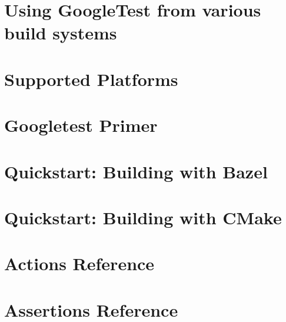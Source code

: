\let\mypdfximage\pdfximage\def\pdfximage{\immediate\mypdfximage}\documentclass[twoside]{book}
\newcommand{\+}{\discretionary{\mbox{\scriptsize$\hookleftarrow$}}{}{}}
\begin{document}
\chapter{Using Google\+Test from various build systems}
\label{md_04_cmake_build_debug__deps_googletest_src_docs_pkgconfig}

\chapter{Supported Platforms}
\label{md_04_cmake_build_debug__deps_googletest_src_docs_platforms}

\chapter{Googletest Primer}
\label{md_04_cmake_build_debug__deps_googletest_src_docs_primer}

\chapter{Quickstart\+: Building with Bazel}
\label{md_04_cmake_build_debug__deps_googletest_src_docs_quickstart_bazel}

\chapter{Quickstart\+: Building with CMake}
\label{md_04_cmake_build_debug__deps_googletest_src_docs_quickstart_cmake}

\chapter{Actions Reference}
\label{md_04_cmake_build_debug__deps_googletest_src_docs_reference_actions}

\chapter{Assertions Reference}
\label{md_04_cmake_build_debug__deps_googletest_src_docs_reference_assertions}

\end{document}
